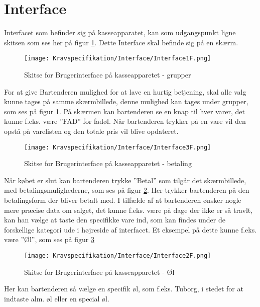 \section{Interface}
Interfacet som befinder sig på kasseapparatet, kan som udgangspunkt ligne skitsen som ses her på figur \ref{fig:Interface1}. Dette Interface skal befinde sig på en skærm.

\begin{figure}[ht]
	\centering
	\texttt{[image: Kravspecifikation/Interface/Interface1F.png]}
	\caption{Skitse for Brugerinterface på kasseapparetet - grupper}
	\label{fig:Interface1}
\end{figure}

For at give Bartenderen mulighed for at lave en hurtig betjening, skal alle valg kunne tages på samme skærmbillede, denne mulighed kan tages under grupper, som ses på figur \ref{fig:Interface1}. 
\newline\newline
På skærmen kan bartenderen se en knap til hver varer, det kunne f.eks. være ''FAD'' for fadøl. Når bartenderen trykker på en vare vil den opstå på varelisten og den totale pris vil blive opdateret. 

\begin{figure}[H]
	\centering
	\texttt{[image: Kravspecifikation/Interface/Interface3F.png]}
	\caption{Skitse for Brugerinterface på kasseapparetet - betaling}
	\label{fig:Interface3}
\end{figure}
Når købet er slut kan bartenderen trykke ''Betal'' som tilgår det skærmbillede, med betalingsmulighederne, som ses på figur \ref{fig:Interface3}. Her trykker bartenderen på den betalingsform der bliver betalt med. 
\newpage
I tilfælde af at bartenderen ønsker nogle mere præcise data om salget, det kunne f.eks. være på dage der ikke er så travlt, kan han vælge at taste den specifikke vare ind, som kan findes under de forskellige kategori ude i højreside af interfacet. Et eksempel på dette kunne f.eks. være ''Øl'', som ses på figur \ref{fig:Interface2}

\begin{figure}[ht]
	\centering
	\texttt{[image: Kravspecifikation/Interface/Interface2F.png]}
	\caption{Skitse for Brugerinterface på kasseapparetet - Øl}
	\label{fig:Interface2}
\end{figure}

Her kan bartenderen så vælge en specifik øl, som f.eks. Tuborg, i stedet for at indtaste alm. øl eller en special øl.

